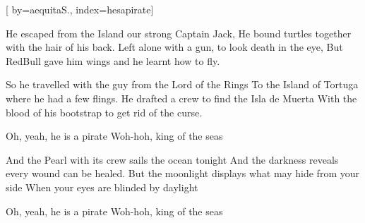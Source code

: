 
[%
    by={aequitaS.},
    index={hesapirate}]


    \label{hesapirate}

    \beginverse
        He escaped from the Island our strong Captain Jack,
        He bound turtles together with the hair of his back.
        Left alone with a gun, to look death in the eye,
        But RedBull gave him wings and he learnt how to fly.
    \endverse

    \beginverse
        So he travelled with the guy from the Lord of the Rings
        To the Island of Tortuga where he had a few flings.
        He drafted a crew to find the Isla de Muerta
        With the blood of his bootstrap to get rid of the curse.
    \endverse

    \beginchorus
        \lrep Oh, yeah, he is a pirate
        Woh-hoh, king of the seas \rrep {}
    \endchorus

    \beginverse*
        And the Pearl with its crew sails the ocean tonight
        And the darkness reveals every wound can be healed.
        But the moonlight displays what may hide from your side
        When your eyes are blinded by daylight
    \endverse

    \beginchorus
        \lrep Oh, yeah, he is a pirate
        Woh-hoh, king of the seas \rrep {}
    \endchorus
\endsong

